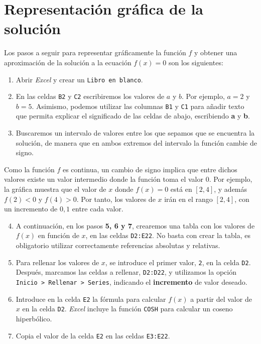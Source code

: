 \documentclass[
  spanish,
  11pt,
  a4paper,
  DIV=11,
  numbers=noendperiod]{scrartcl}
\begin{document}
\section{Representación gráfica de la solución}
\label{representacion-grafica-de-la-solucion}

Los pasos a seguir para representar gráficamente la función \(f\) y obtener una aproximación de la solución a la ecuación \(f(x) = 0\) son los siguientes:

\begin{enumerate}
\item Abrir \emph{Excel} y crear un \texttt{Libro en blanco}.
\item En las celdas \texttt{B2} y \texttt{C2} escribiremos los valores de \(a\) y \(b\). Por ejemplo, \(a = 2\) y \(b = 5\). Asimismo, podemos utilizar las columnas \texttt{B1} y \texttt{C1} para añadir texto que permita explicar el significado de las celdas de abajo, escribiendo \textbf{a} y \textbf{b}.
\item Buscaremos un intervalo de valores entre los que sepamos que se encuentra la solución, de manera que en ambos extremos del intervalo la función cambie de signo.
\end{enumerate}

Como la función \(f\) es continua, un cambio de signo implica que entre dichos valores existe un valor intermedio donde la función toma el valor \(0\). Por ejemplo, la gráfica muestra que el valor de \(x\) donde \(f(x) = 0\) está en \([2, 4]\), y además \(f(2) < 0\) y \(f(4) > 0\). Por tanto, los valores de \(x\) irán en el rango \([2, 4]\), con un incremento de \(0,1\) entre cada valor.

\begin{enumerate}
\setcounter{enumi}{3}
\item A continuación, en los pasos \textbf{5, 6 y 7}, crearemos una tabla con los valores de \(f(x)\) en función de \(x\), en las celdas \texttt{D2:E22}. No basta con crear la tabla, es obligatorio utilizar correctamente referencias absolutas y relativas.
\item Para rellenar los valores de \(x\), se introduce el primer valor, \texttt{2}, en la celda \texttt{D2}. Después, marcamos las celdas a rellenar, \texttt{D2:D22}, y utilizamos la opción \texttt{Inicio > Rellenar > Series}, indicando el \textbf{incremento} de valor deseado.
\item Introduce en la celda \texttt{E2} la fórmula para calcular \(f(x)\) a partir del valor de \(x\) en la celda \texttt{D2}. \emph{Excel} incluye la función \texttt{COSH} para calcular un coseno hiperbólico.
\item Copia el valor de la celda \texttt{E2} en las celdas \texttt{E3:E22}.
\end{enumerate}
\end{document}
